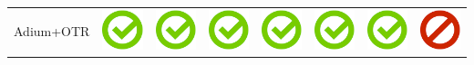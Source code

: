 \documentclass[10pt,foldmark,tumble]{leaflet}
\begin{document}
{\begin{tabular}{ L{2cm} | C{2cm} | C{2cm} | C{2cm} | C{2cm} | C{2cm} | C{2cm} | C{2cm} | }
Adium+OTR & \includegraphics[scale=0.1]{pics/haken.png} & \includegraphics[scale=0.1]{pics/haken.png} & \includegraphics[scale=0.1]{pics/haken.png} & \includegraphics[scale=0.1]{pics/haken.png} & \includegraphics[scale=0.1]{pics/haken.png} & \includegraphics[scale=0.1]{pics/haken.png} & \includegraphics[scale=0.1]{pics/nohaken.png} \tabularnewline

\end{tabular}}
\end{document}

